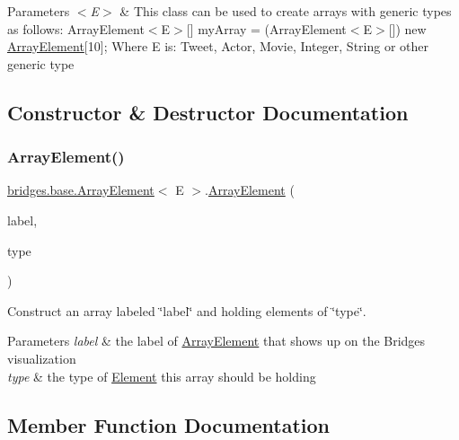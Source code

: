 \begin{DoxyParams}{Parameters}
{\em $<$\+E$>$} & This class can be used to create arrays with generic types as follows\+: Array\+Element$<$\+E$>$\mbox{[}\mbox{]} my\+Array = (Array\+Element$<$\+E$>$\mbox{[}\mbox{]}) new \hyperlink{classbridges_1_1base_1_1_array_element}{Array\+Element}\mbox{[}10\mbox{]}; Where E is\+: Tweet, Actor, Movie, Integer, String or other generic type \\
\hline
\end{DoxyParams}


\subsection{Constructor \& Destructor Documentation}
\hypertarget{classbridges_1_1base_1_1_array_element_a90cbba952d50ff26fd2b89e9f3f81322}{}\label{classbridges_1_1base_1_1_array_element_a90cbba952d50ff26fd2b89e9f3f81322} 
\subsubsection{\texorpdfstring{Array\+Element()}{ArrayElement()}}
{\footnotesize\ttfamily \hyperlink{classbridges_1_1base_1_1_array_element}{bridges.\+base.\+Array\+Element}$<$ E $>$.\hyperlink{classbridges_1_1base_1_1_array_element}{Array\+Element} (\begin{DoxyParamCaption}\item[{String}]{label,  }\item[{E}]{type }\end{DoxyParamCaption})}

Construct an array labeled \char`\"{}label\char`\"{} and holding elements of \char`\"{}type\char`\"{}. 
\begin{DoxyParams}{Parameters}
{\em label} & the label of \hyperlink{classbridges_1_1base_1_1_array_element}{Array\+Element} that shows up on the Bridges visualization \\
\hline
{\em type} & the type of \hyperlink{classbridges_1_1base_1_1_element}{Element} this array should be holding \\
\hline
\end{DoxyParams}


\subsection{Member Function Documentation}
\hypertarget{classbridges_1_1base_1_1_array_element_a1d4f3fae7bd986237e364c2cce0bea77}{}\label{classbridges_1_1base_1_1_array_element_a1d4f3fae7bd986237e364c2cce0bea77} 
